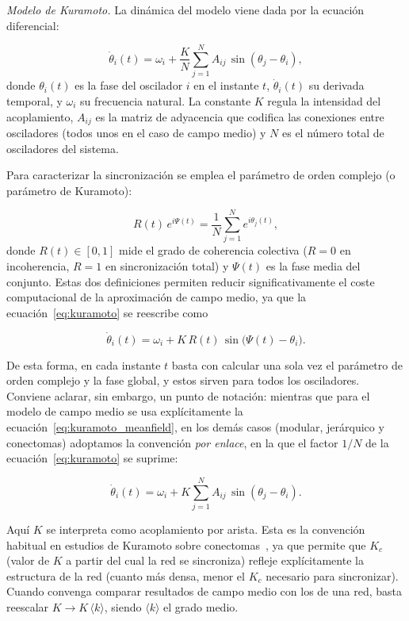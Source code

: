 \documentclass[
  reprint,
  amsmath,amssymb,
  aps,
  pra,
]{revtex4-2}
\begin{document}
\textit{Modelo de Kuramoto.}\;
La dinámica del modelo viene dada por la ecuación diferencial:

\begin{equation}
  \dot{\theta}_i(t) = \omega_i + \frac{K}{N} \sum_{j=1}^{N} A_{ij}\,\sin(\theta_j - \theta_i),
  \label{eq:kuramoto}
\end{equation}
donde \(\theta_i(t)\) es la fase del oscilador \(i\) en el instante \(t\), \(\dot{\theta}_i(t)\) su derivada temporal, y \(\omega_i\) su frecuencia natural. La constante \(K\) regula la intensidad del acoplamiento, \(A_{ij}\) es la matriz de adyacencia que codifica las conexiones entre osciladores (todos unos en el caso de campo medio) y \(N\) es el número total de osciladores del sistema.

Para caracterizar la sincronización se emplea el parámetro de orden complejo (o parámetro de Kuramoto):

\begin{equation}
  R(t)\,e^{i\Psi(t)} = \frac{1}{N}\sum_{j=1}^{N} e^{i\theta_j(t)},
  \label{eq:R}
\end{equation}
donde \(R(t)\in[0,1]\) mide el grado de coherencia colectiva (\(R=0\) en incoherencia, \(R=1\) en sincronización total) y \(\Psi(t)\) es la fase media del conjunto. Estas dos definiciones permiten reducir significativamente el coste computacional de la aproximación de campo medio, ya que la ecuación~\eqref{eq:kuramoto} se reescribe como

\begin{equation}
  \dot{\theta}_i(t) = \omega_i + K\,R(t)\,\sin\bigl(\Psi(t) - \theta_i\bigr).
  \label{eq:kuramoto_meanfield}
\end{equation}

De esta forma, en cada instante \(t\) basta con calcular una sola vez el parámetro de orden complejo y la fase global, y estos sirven para todos los osciladores. Conviene aclarar, sin embargo, un punto de notación: mientras que para el modelo de campo medio se usa explícitamente la ecuación~\eqref{eq:kuramoto_meanfield}, en los demás casos (modular, jerárquico y conectomas) adoptamos la convención \textit{por enlace}, en la que el factor \(1/N\) de la ecuación~\eqref{eq:kuramoto} se suprime:

\begin{equation}
  \dot{\theta}_i(t) = \omega_i + K \sum_{j=1}^{N} A_{ij}\,\sin(\theta_j - \theta_i).
  \label{eq:kuramoto_noN}
\end{equation}

Aquí \(K\) se interpreta como acoplamiento por arista. Esta es la convención habitual en estudios de Kuramoto sobre conectomas~\cite{cabral2011role,villegas2014frustrated}, ya que permite que \(K_c\) (valor de $K$ a partir del cual la red se sincroniza) refleje explícitamente la estructura de la red (cuanto más densa, menor el \(K_c\) necesario para sincronizar). Cuando convenga comparar resultados de campo medio con los de una red, basta reescalar \(K \to K\,\langle k\rangle\), siendo \(\langle k\rangle\) el grado medio.
\end{document}
